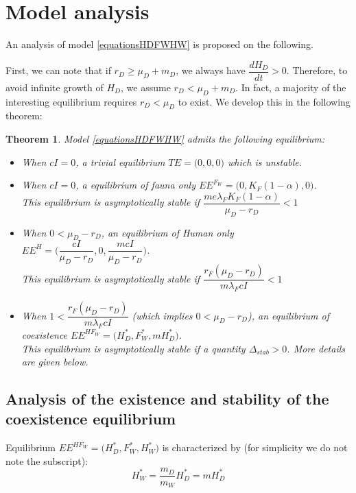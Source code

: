 \documentclass{article}
\newcommand{\lfw}{\lambda_{F}}
\newcommand{\lfw}{\lambda_{F}}
\newtheorem{theorem}{Theorem}
\begin{document}
\section{Model analysis}
An analysis of model \eqref{equationsHDFWHW} is proposed on the following.

First, we can note that if $r_D \geq \mu_D + m_D$, we always have $\dfrac{dH_D}{dt} > 0$. Therefore, to avoid infinite growth of $H_D$, we assume $r_D < \mu_D + m_D$. In fact, a majority of the interesting equilibrium requires $r_D < \mu_D$ to exist. We develop this in the following theorem:

\begin{theorem} Model \eqref{equationsHDFWHW} admits the following equilibrium:\\
\begin{itemize}
\item When $cI = 0$, a trivial  equilibrium $TE = \Big(0,0,0\Big)$ which is unstable.
\item When $cI = 0$, a equilibrium of fauna only $EE^{F_W} = \Big(0, K_F(1-\alpha), 0 \Big)$. \\
This equilibrium is asymptotically stable if $\dfrac{m e \lfw K_F(1-\alpha)}{\mu_D - r_D} < 1 $
\item When $0 < \mu_D - r_D$, an equilibrium of Human only $EE^{H} = \Big(\dfrac{cI}{\mu_D - r_D}, 0, \dfrac{m cI}{\mu_D - r_D} \Big)$. \\
This equilibrium is asymptotically stable if $\dfrac{r_F (\mu_D -r_D) }{m \lfw cI} < 1$
\item When $1 < \dfrac{r_F (\mu_D -r_D) }{m \lfw cI}$ (which implies $0 < \mu_D - r_D $), an equilibrium of coexistence $EE^{HF_W} = \Big(H^*_{D}, F^*_{W}, m H^*_{D} \Big)$. \\
This equilibrium is asymptotically stable if a quantity $\Delta_{stab} > 0$. More details are given below.
\end{itemize}
\end{theorem}

\subsection{Analysis of the existence and stability of the coexistence equilibrium}

Equilibrium $EE^{HF_W} = \Big(H^*_{D}, F^*_{W}, H^*_{W} \Big)$ is characterized by (for simplicity we do not note the subscript):
\begin{equation*}
H_W^* =  \dfrac{m_D}{m_W} H_D^* = m H_D^*
\end{equation*}
\end{document}
